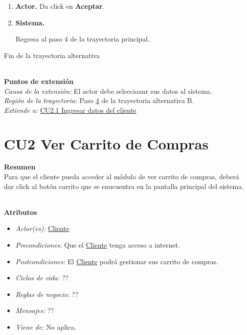\begin{itemize}
\begin{enumerate}
				\item \textbf{Actor.} Da click en \textbf{Aceptar}.
				
				\item \hypertarget{CU1:TAB:P4} {\textbf{Sistema.}} Regresa al paso 4 de la trayectoria principal.
	
			\end{enumerate}
			
			Fin de la trayectoria alternativa
		

	\end{itemize}

	\noindent \textbf{\\Puntos de extensión}\\

		\noindent \textit{Causa de la extensión:} El actor debe seleccioanr sus datos al sistema.\\
		\textit{Región de la trayectoria:} Paso \hyperlink{CU1:TAB:P4}{4} de la trayectoria alternativa B.\\
		\textit{Extiende a:} \hyperlink{CU2.1}{CU2.1 Ingresar datos del cliente}\\

		
\hypertarget{CU2}{}
\section{CU2 Ver Carrito de Compras}

\noindent \textbf{Resumen}\\

Para que el cliente pueda acceder al módulo de ver carrito de compras, deberá dar click al botón carrito que se enucuentra en la pantalla principal del sistema.

\noindent \textbf{\\Atributos}

\begin{itemize}
	
	\item \textit{Actor(es):} \hyperlink{A:Cliente}{Cliente}
	\item \textit{Precondiciones:} Que el \hyperlink{A:Cliente}{Cliente} tenga acceso a internet. 
	\item \textit{Postcondiciones:} El \hyperlink{A:Cliente}{Cliente} podrá gestionar sus carrito de compras.
	\item \textit{Ciclos de vida:} ?? 
	\item \textit{Reglas de negocio:} ??
	\item \textit{Mensajes:} ??
	\item \textit{Viene de:} No aplica.
	
\end{itemize} 
		

